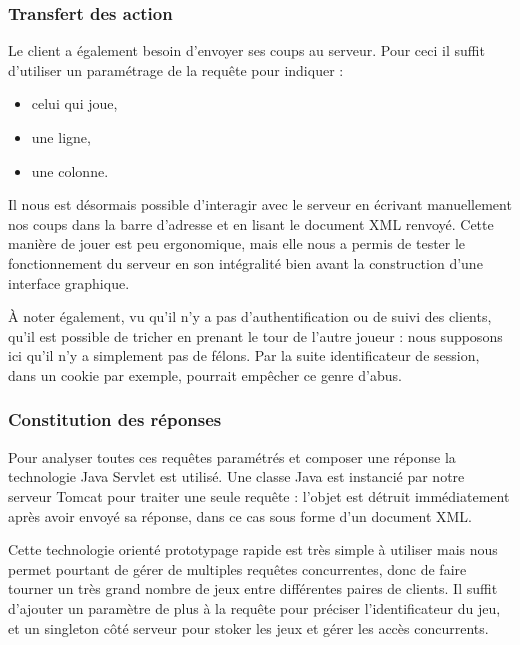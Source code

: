 \subsubsection{Transfert des action}
Le client a également besoin d'envoyer ses coups au serveur. Pour ceci il suffit d'utiliser un paramétrage de la requête pour indiquer :
\begin{itemize}
\item celui qui joue,
\item une ligne,
\item une colonne.
\end{itemize}
Il nous est désormais possible d'interagir avec le serveur en écrivant manuellement nos coups dans la barre d'adresse et en lisant le document XML renvoyé. Cette manière de jouer est peu ergonomique, mais elle nous a permis de tester le fonctionnement du serveur en son intégralité bien avant la construction d'une interface graphique.

À noter également, vu qu'il n'y a pas d'authentification ou de suivi des clients, qu'il est possible de \og tricher \fg{} en prenant le tour de l'autre joueur  : nous supposons ici qu'il n'y a simplement pas de félons. Par la suite identificateur de session, dans un cookie par exemple, pourrait empêcher ce genre d'abus. 
\subsubsection{Constitution des réponses}
Pour analyser toutes ces requêtes paramétrés et composer une réponse la technologie \og Java Servlet \fg {} est utilisé. Une classe Java est instancié par notre serveur Tomcat pour traiter une seule requête : l'objet est détruit immédiatement après avoir envoyé sa réponse, dans ce cas sous forme d'un document XML.

Cette technologie orienté prototypage rapide est très simple à utiliser mais nous permet pourtant de gérer de multiples requêtes concurrentes, donc de faire tourner un très grand nombre de jeux entre différentes paires de clients. Il suffit d'ajouter un paramètre de plus à la requête pour préciser l'identificateur du jeu, et un singleton côté serveur pour stoker les jeux et gérer les accès concurrents.
